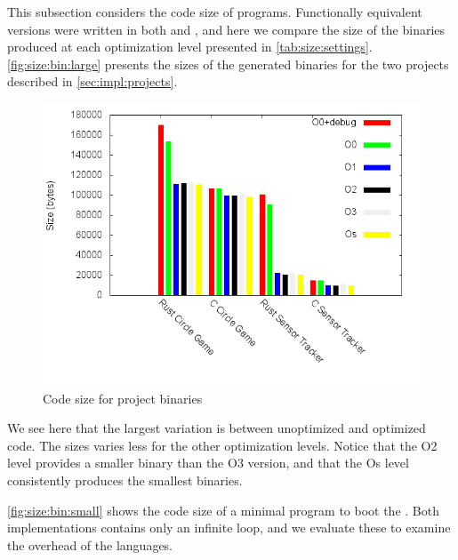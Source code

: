 This subsection considers the code size of programs.
Functionally equivalent versions were written in both {\rust} and {\C}, and here we compare the size of the binaries produced at each optimization level presented in \autoref{tab:size:settings}.
\autoref{fig:size:bin:large} presents the sizes of the generated binaries for the two projects described in \autoref{sec:impl:projects}.

\begin{figure}[H]
  \begin{center}
    \includegraphics[scale=0.5]{results/plots/size/bin/large/size.png}
  \end{center}
  \caption{Code size for project binaries}
  \label{fig:size:bin:large}
\end{figure}


We see here that the largest variation is between unoptimized and optimized {\rust} code.
The sizes varies less for the other optimization levels.
Notice that the O2 level provides a smaller binary than the O3 version, and that the Os level consistently produces the smallest binaries.

\autoref{fig:size:bin:small} shows the code size of a minimal program to boot the {\gecko}.
Both implementations contains only an infinite loop, and we evaluate these to examine the overhead of the languages.

